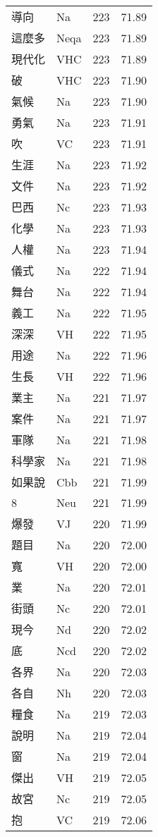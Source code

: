 \documentclass[twocolumn]{book}
\begin{document}
\begin{supertabular}{llrr}
導向 & Na & 223 &  71.89\\
這麼多 & Neqa & 223 &  71.89\\
現代化 & VHC & 223 &  71.89\\
破 & VHC & 223 &  71.90\\
氣候 & Na & 223 &  71.90\\
勇氣 & Na & 223 &  71.91\\
吹 & VC & 223 &  71.91\\
生涯 & Na & 223 &  71.92\\
文件 & Na & 223 &  71.92\\
巴西 & Nc & 223 &  71.93\\
化學 & Na & 223 &  71.93\\
人權 & Na & 223 &  71.94\\
儀式 & Na & 222 &  71.94\\
舞台 & Na & 222 &  71.94\\
義工 & Na & 222 &  71.95\\
深深 & VH & 222 &  71.95\\
用途 & Na & 222 &  71.96\\
生長 & VH & 222 &  71.96\\
業主 & Na & 221 &  71.97\\
案件 & Na & 221 &  71.97\\
軍隊 & Na & 221 &  71.98\\
科學家 & Na & 221 &  71.98\\
如果說 & Cbb & 221 &  71.99\\
8 & Neu & 221 &  71.99\\
爆發 & VJ & 220 &  71.99\\
題目 & Na & 220 &  72.00\\
寬 & VH & 220 &  72.00\\
業 & Na & 220 &  72.01\\
街頭 & Nc & 220 &  72.01\\
現今 & Nd & 220 &  72.02\\
底 & Ncd & 220 &  72.02\\
各界 & Na & 220 &  72.03\\
各自 & Nh & 220 &  72.03\\
糧食 & Na & 219 &  72.03\\
說明 & Na & 219 &  72.04\\
窗 & Na & 219 &  72.04\\
傑出 & VH & 219 &  72.05\\
故宮 & Nc & 219 &  72.05\\
抱 & VC & 219 &  72.06\\

\end{supertabular}
\end{document}
